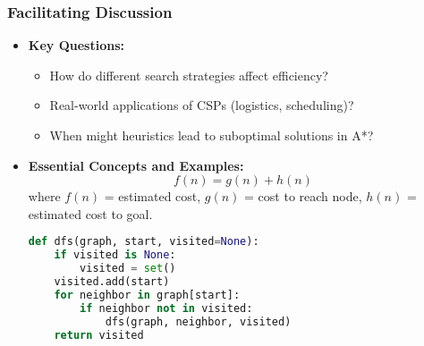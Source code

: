 \documentclass[aspectratio=169]{beamer}
\begin{document}
\begin{frame}[fragile]
    \frametitle{Facilitating Discussion}
    \begin{itemize}
        \item \textbf{Key Questions:}
            \begin{itemize}
                \item How do different search strategies affect efficiency?
                \item Real-world applications of CSPs (logistics, scheduling)?
                \item When might heuristics lead to suboptimal solutions in A*?
            \end{itemize}

        \item \textbf{Essential Concepts and Examples:}
            \begin{equation}
                f(n) = g(n) + h(n)
            \end{equation}
            where \( f(n) \) = estimated cost, \( g(n) \) = cost to reach node, \( h(n) \) = estimated cost to goal.

            \begin{lstlisting}[language=Python]
def dfs(graph, start, visited=None):
    if visited is None:
        visited = set()
    visited.add(start)
    for neighbor in graph[start]:
        if neighbor not in visited:
            dfs(graph, neighbor, visited)
    return visited
            \end{lstlisting}
    \end{itemize}
\end{frame}
\end{document}
